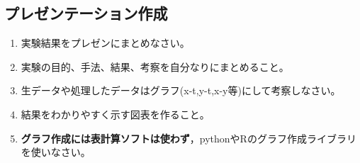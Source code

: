 \documentclass{jsarticle}
\begin{document}
\subsection{プレゼンテーション作成}
\begin{enumerate}
\item 実験結果をプレゼンにまとめなさい。
\item 実験の目的、手法、結果、考察を自分なりにまとめること。
\item 生データや処理したデータはグラフ(x-t,y-t,x-y等)にして考察しなさい。
\item 結果をわかりやすく示す図表を作ること。
\item \textbf{グラフ作成には表計算ソフトは使わず}，pythonやRのグラフ作成ライブラリを使いなさい。
\end{enumerate}

\end{document}
